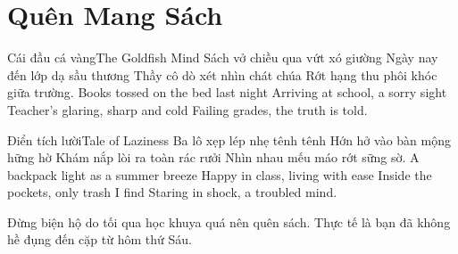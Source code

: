 \chapter{Quên Mang Sách}

\begin{tutuyetbox}{Cái đầu cá vàng}{The Goldfish Mind}
Sách vở chiều qua vứt xó giường
Ngày nay đến lớp dạ sầu thương
Thầy cô dò xét nhìn chát chúa
Rớt hạng thu phôi khóc giữa trường.
\tcblower
Books tossed on the bed last night 
Arriving at school, a sorry sight 
Teacher's glaring, sharp and cold 
Failing grades, the truth is told.
\end{tutuyetbox}

\begin{tutuyetbox}{Điển tích lười}{Tale of Laziness}
Ba lô xẹp lép nhẹ tênh tênh
Hớn hở vào bàn mộng hững hờ
Khám nắp lòi ra toàn rác rưởi
Nhìn nhau mếu máo rớt sững sờ.
\tcblower
A backpack light as a summer breeze 
Happy in class, living with ease 
Inside the pockets, only trash I find 
Staring in shock, a troubled mind.
\end{tutuyetbox}

\begin{ghichu}
Đừng biện hộ do tối qua học khuya quá nên quên sách. Thực tế là bạn đã không hề đụng đến cặp từ hôm thứ Sáu.
\end{ghichu}